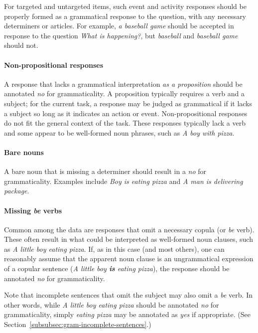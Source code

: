 \documentclass[12pt,notitlepage]{article}
\begin{document}
For targeted and untargeted items, such event and activity responses should be properly formed as a grammatical response to the question, with any necessary determiners or articles. For example, \textit{a baseball game} should be accepted in response to the question \textit{What is happening?}, but \textit{baseball} and \textit{baseball game} should not.

\paragraph{Non-propositional responses} \label{para:non-propositional} A response that lacks a grammatical interpretation \textit{as a proposition} should be annotated \textit{no} for grammaticality. A proposition typically requires a verb and a subject; for the current task, a response may be judged as grammatical if it lacks a subject so long as it indicates an action or event. Non-propositional responses do not fit the general context of the task. These responses typically lack a verb and some appear to be well-formed noun phrases, such as \textit{A boy with pizza}.

\paragraph{Bare nouns} A bare noun that is missing a determiner should result in a \textit{no} for grammaticality. Examples include \textit{Boy is eating pizza} and \textit{A man is delivering package}.

\paragraph{Missing \textit{be} verbs} Common among the data are responses that omit a necessary copula (or \textit{be} verb). These often result in what could be interpreted as well-formed noun clauses, such as \textit{A little boy eating pizza}. If, as in this case (and most others), one can reasonably assume that the apparent noun clause is an ungrammatical expression of a copular sentence (\textit{A little boy \textbf{is} eating pizza}), the response should be annotated \textit{no} for grammaticality. 

Note that incomplete sentences that omit the subject may also omit a \textit{be} verb. In other words, while \textit{A little boy eating pizza} should be annotated \textit{no} for grammaticality, simply \textit{eating pizza} may be annotated as \textit{yes} if appropriate. (See Section~\ref{subsubsec:gram-incomplete-sentences}.)
\end{document}

